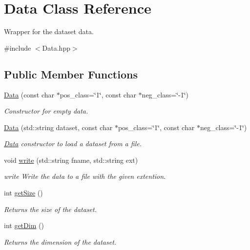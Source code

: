 \hypertarget{class_data}{}\section{Data Class Reference}
\label{class_data}


Wrapper for the dataset data.  




{\ttfamily \#include $<$Data.\+hpp$>$}

\subsection*{Public Member Functions}
\begin{DoxyCompactItemize}
\item 
\hyperlink{class_data_aa3ca35c963eec5a4734df23f88443077}{Data} (const char $\ast$pos\+\_\+class=\char`\"{}1\char`\"{}, const char $\ast$neg\+\_\+class=\char`\"{}-\/1\char`\"{})
\begin{DoxyCompactList}\small\item\em Constructor for empty data. \end{DoxyCompactList}\item 
\hyperlink{class_data_a85afba1f115dce4b6d2a952326624dd4}{Data} (std\+::string dataset, const char $\ast$pos\+\_\+class=\char`\"{}1\char`\"{}, const char $\ast$neg\+\_\+class=\char`\"{}-\/1\char`\"{})
\begin{DoxyCompactList}\small\item\em \hyperlink{class_data}{Data} constructor to load a dataset from a file. \end{DoxyCompactList}\item 
void \hyperlink{class_data_a6550f72555320ae9225ba216a9f4e7b3}{write} (std\+::string fname, std\+::string ext)
\begin{DoxyCompactList}\small\item\em write Write the data to a file with the given extention. \end{DoxyCompactList}\item 
int \hyperlink{class_data_abfd7c7cca66a186ff45efa430bcb2f1e}{get\+Size} ()
\begin{DoxyCompactList}\small\item\em Returns the size of the dataset. \end{DoxyCompactList}\item 
int \hyperlink{class_data_a0391940729a8023ea9b154132a854d35}{get\+Dim} ()
\begin{DoxyCompactList}\small\item\em Returns the dimension of the dataset. \end{DoxyCompactList}\item 

\end{DoxyCompactItemize}
